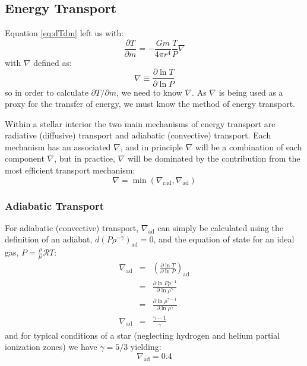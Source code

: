\subsection{Energy Transport}
\label{sec:theory:transport}
Equation \ref{eq:dTdm} left us with:
\begin{equation*}
   \frac{\partial T}{\partial m} = - \frac{G m}{4 \pi r^4} \frac{T}{P} \nabla
\end{equation*}
 with $\nabla$ defined as:
 \begin{equation*}
   \nabla \equiv \frac{\partial \ln T}{\partial \ln P}
 \end{equation*}
so in order to calculate $\partial T / \partial m$, we need to know $\nabla$.  As $\nabla$ is being used as a proxy for the transfer of energy, we must know the method of energy transport.

Within a stellar interior the two main mechanisms of energy transport are radiative (diffusive) transport and adiabatic (convective) transport.  Each mechanism has an associated $\nabla$, and in principle $\nabla$ will be a combination of each component $\nabla$, but in practice, $\nabla$ will be dominated by the contribution from the most efficient transport mechanism:
\begin{equation}
  \nabla = \min\left( \nabla_{\mathrm{rad}}, \nabla_{\mathrm{ad}}\right)
  \label{eq:del:def}
\end{equation}

\subsubsection{Adiabatic Transport}
\label{sec:theory:transport:ad}
For adiabatic (convective) transport, $\nabla_\mathrm{ad}$ can simply be calculated using the definition of an adiabat, $d(P \rho^{-\gamma})_\mathrm{ad} = 0$, and the equation of state for an ideal gas, $P = \frac{\rho}{\mu}\mathcal{R} T $:
\begin{eqnarray}
  \nabla_\mathrm{ad} &=& \left( \frac{\partial \ln T}{\partial \ln P}\right)_\mathrm{ad} \nonumber \\
   &=&  \frac{\partial \ln P \rho^{-1}}{\partial \ln \rho^{\gamma}} \nonumber \\
   &=&  \frac{\partial \ln \rho^{\gamma-1}}{\partial \ln \rho^{\gamma}} \nonumber \\
  \nabla_\mathrm{ad} &=& \frac{\gamma-1}{\gamma}
  \label{eq:del:ad:def}
\end{eqnarray}
and for typical conditions of a star (neglecting hydrogen and helium partial ionization zones) we have $\gamma = 5/3$ yielding:
\begin{equation}
  \nabla_\mathrm{ad} = 0.4
\end{equation}

